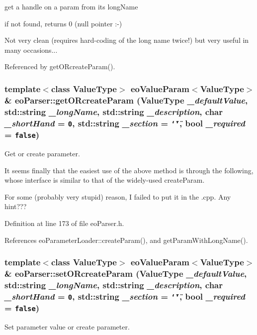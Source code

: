 get a handle on a param from its long\-Name 

if not found, returns 0 (null pointer :-)

Not very clean (requires hard-coding of the long name twice!) but very useful in many occasions... 

Referenced by get\-ORcreate\-Param().
\subsubsection{\setlength{\rightskip}{0pt plus 5cm}template$<$class Value\-Type$>$ {\bf eo\-Value\-Param}$<$Value\-Type$>$\& eo\-Parser::get\-ORcreate\-Param (Value\-Type {\em \_\-default\-Value}, std::string {\em \_\-long\-Name}, std::string {\em \_\-description}, char {\em \_\-short\-Hand} = {\tt 0}, std::string {\em \_\-section} = {\tt \char`\"{}\char`\"{}}, bool {\em \_\-required} = {\tt false})\hspace{0.3cm}{\tt  [inline]}}\label{classeo_parser_a10}


Get or create parameter. 

It seems finally that the easiest use of the above method is through the following, whose interface is similar to that of the widely-used create\-Param.

For some (probably very stupid) reason, I failed to put it in the .cpp. Any hint??? 

Definition at line 173 of file eo\-Parser.h.

References eo\-Parameter\-Loader::create\-Param(), and get\-Param\-With\-Long\-Name().
\subsubsection{\setlength{\rightskip}{0pt plus 5cm}template$<$class Value\-Type$>$ {\bf eo\-Value\-Param}$<$Value\-Type$>$\& eo\-Parser::set\-ORcreate\-Param (Value\-Type {\em \_\-default\-Value}, std::string {\em \_\-long\-Name}, std::string {\em \_\-description}, char {\em \_\-short\-Hand} = {\tt 0}, std::string {\em \_\-section} = {\tt \char`\"{}\char`\"{}}, bool {\em \_\-required} = {\tt false})\hspace{0.3cm}{\tt  [inline]}}\label{classeo_parser_a11}


Set parameter value or create parameter. 

